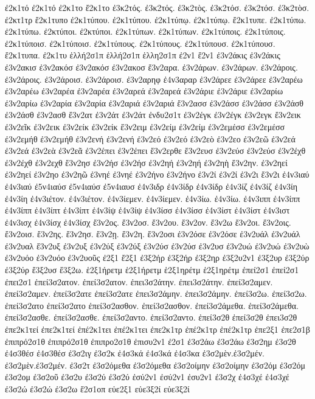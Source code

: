 {ἐ2κ1τό  ἐ2κ1τό
ἐ2κ1το
ἔ2κ1το
ἐ3κ2τός.  ἐ3κ2τός.
ἐ3κ2τὸς.
ἐ3κ2τόσ.  ἐ3κ2τόσ.
ἐ3κ2τὸσ.
ἐ2κτ1τρ
ἔ2κ1τυπο
ἐ2κ1τύπου.  ἐ2κ1τύπου.
ἐ2κ1τύπῳ.  ἐ2κ1τύπῳ.
ἔ2κ1τυπε.
ἐ2κ1τύπω.  ἐ2κ1τύπω.
ἐ2κτύποι.  ἐ2κτύποι.
ἐ2κ1τύπων.  ἐ2κ1τύπων.
ἐ2κ1τύποις.  ἐ2κ1τύποις.
ἐ2κ1τύποισ.  ἐ2κ1τύποισ.
ἐ2κ1τύπους.  ἐ2κ1τύπους.
ἐ2κ1τύπουσ.  ἐ2κ1τύπουσ.
ἔ2κ1τυπα.
ἐ2κ1τυ
ἑλλή2σ1π  ἑλλή2σ1π
ἑλλη2σ1π
ἐ2ν1
ἔ2ν1
ἐ3ν2άκις  ἐ3ν2άκις
ἐ3ν2ακισ
ἐ3ν2ακόσ  ἐ3ν2ακόσ
ἐ3ν2ακοσ
ἔ3ν2αρα.
ἐ3ν2άρων.  ἐ3ν2άρων.
ἐ3ν2άροις.  ἐ3ν2άροις.
ἐ3ν2άροισ.  ἐ3ν2άροισ.
ἐ3ν2αρηφ
ἐ4ν3αραρ
ἐ3ν2άρεε  ἐ3ν2άρεε
ἐ3ν2αρέω  ἐ3ν2αρέω
ἐ3ν2αρέα  ἐ3ν2αρέα
ἐ3ν2αρεά  ἐ3ν2αρεά
ἐ3ν2άριε  ἐ3ν2άριε
ἐ3ν2αρίω  ἐ3ν2αρίω
ἐ3ν2αρία  ἐ3ν2αρία
ἐ3ν2αριά  ἐ3ν2αριά
ἔ3ν2ασσ
ἐ3ν2άσσ  ἐ3ν2άσσ
ἐ3ν2άσθ  ἐ3ν2άσθ
ἐ3ν2ασθ
ἔ3ν2ατ
ἐ3ν2άτ  ἐ3ν2άτ
ἐνδυ2σ1τ
ἐ3ν2έγκ  ἐ3ν2έγκ
ἐ3ν2εγκ
ἔ3ν2εικ
ἐ3ν2εῖκ
ἐ3ν2εικ
ἐ3ν2είκ  ἐ3ν2είκ
ἔ3ν2ειμ
ἐ3ν2είμ  ἐ3ν2είμ
ἐ3ν2εμέσσ  ἐ3ν2εμέσσ
ἐ3ν2εμήθ  ἐ3ν2εμήθ
ἐ3ν2ενή  ἐ3ν2ενή
ἐ3ν2εό  ἐ3ν2εό
ἐ3ν2εὸ
ἐ3ν2εο
ἐ3ν2εῶ
ἐ3ν2εά  ἐ3ν2εά
ἐ3ν2εὰ
ἐ3ν2εᾶ
ἐ3ν2έπει  ἐ3ν2έπει
ἔ3ν2ερθε
ἔ3ν2ευσ
ἐ3ν2εύσ  ἐ3ν2εύσ
ἐ3ν2έχθ  ἐ3ν2έχθ
ἐ3ν2εχθ
ἔ3ν2ησ
ἐ3ν2ήσ  ἐ3ν2ήσ
ἐ3ν2ηή  ἐ3ν2ηή
ἐ3ν2ηὴ
ἔ3ν2ην.
ἐ3ν2ηεί  ἐ3ν2ηεί
ἐ3ν2ηο
ἐ3ν2ηῶ
ἐ3νηέ  ἐ3νηέ
ἐ3ν2ήνο  ἐ3ν2ήνο
ἐ3ν2ί  ἐ3ν2ί
ἐ3ν2ι
ἔ3ν2ι
ἐ4ν3ιαύ  ἐ4ν3ιαύ
ἐ5ν4ιαύσ  ἐ5ν4ιαύσ
ἐ5ν4ιαυσ
ἐ4ν3ιδρ
ἐ4ν3ίδρ  ἐ4ν3ίδρ
ἐ4ν3ίζ  ἐ4ν3ίζ
ἐ4ν3ίη  ἐ4ν3ίη
ἐ4ν3ιέτον.  ἐ4ν3ιέτον.
ἐ4ν3ίεμεν.  ἐ4ν3ίεμεν.
ἐ4ν3ίω.  ἐ4ν3ίω.
ἐ4ν3ιππ
ἐ4ν3ίππ  ἐ4ν3ίππ
ἐ4ν3ίπτ  ἐ4ν3ίπτ
ἐ4ν3ίψ  ἐ4ν3ίψ
ἐ4ν3ίσσ  ἐ4ν3ίσσ
ἐ4ν3ίστ  ἐ4ν3ίστ
ἐ4ν3ιστ
ἐ4ν3ισχ
ἐ4ν3ίσχ  ἐ4ν3ίσχ
ἔ3ν2ος.
ἔ3ν2οσ.
ἔ3ν2ου.
ἔ3ν2ον.
ἔ3ν2ω
ἔ3ν2οι.
ἔ3ν2οις.
ἔ3ν2οισ.
ἔ3ν2ης.
ἔ3ν2ησ.
ἔ3ν2ῃ.
ἔ3ν2η.
ἔ3ν2οσι
ἐ3ν2όσε  ἐ3ν2όσε
ἐ3ν2υάλ  ἐ3ν2υάλ
ἐ3ν2υαλ
ἔ3ν2υξ
ἐ3ν2υξ
ἐ3ν2ύξ  ἐ3ν2ύξ
ἐ3ν2ύσ  ἐ3ν2ύσ
ἐ3ν2υσ
ἐ3ν2υώ  ἐ3ν2υώ
ἐ3ν2υὼ
ἐ3ν2υόο  ἐ3ν2υόο
ἐ3ν2υοῦς
ἐ2ξ1
ἔ2ξ1
ἐ3ξ2ήρ  ἐ3ξ2ήρ
ἐ3ξ2ηρ
ἐ3ξ2υ2ν1
ἐ3ξ2υρ
ἐ3ξ2ύρ  ἐ3ξ2ύρ
ἔ3ξ2υσ
ἔ3ξ2ω.
ἑ2ξ1ήρετμ  ἑ2ξ1ήρετμ
ἑ2ξ1ηρέτμ  ἑ2ξ1ηρέτμ
ἐπεί2σ1  ἐπεί2σ1
ἐπει2σ1
ἐπεί3σ2ατον.  ἐπεί3σ2ατον.
ἐπει3σ2άτην.  ἐπει3σ2άτην.
ἐπεί3σ2αμεν.  ἐπεί3σ2αμεν.
ἐπεί3σ2ατε  ἐπεί3σ2ατε
ἐπει3σ2άμην.  ἐπει3σ2άμην.
ἐπεί3σ2ω.  ἐπεί3σ2ω.
ἐπεί3σ2ατο  ἐπεί3σ2ατο
ἐπεί3σ2ασθον.  ἐπεί3σ2ασθον.
ἐπεί3σ2άμεθα.  ἐπεί3σ2άμεθα.
ἐπεί3σ2ασθε.  ἐπεί3σ2ασθε.
ἐπεί3σ2αντο.  ἐπεί3σ2αντο.
ἐπεί3σ2θ  ἐπεί3σ2θ
ἐπει3σ2θ
ἐπε2κ1τεί  ἐπε2κ1τεί
ἐπέ2κ1τει  ἐπέ2κ1τει
ἐπε2κ1τρ
ἐπέ2κ1τρ  ἐπέ2κ1τρ
ἐπε2ξ1
ἐπε2σ1β
ἐπιπρό2σ1θ  ἐπιπρό2σ1θ
ἐπιπρο2σ1θ
ἐπισυ2ν1
ἐ2σ1
ἐ3σ2άω  ἐ3σ2άω
ἐ3σ2ημ
ἐ3σ2θ
ἐ4σ3θέσ  ἐ4σ3θέσ
ἐ3σ2ιγ
ἐ3σ2κ
ἐ4σ3κά  ἐ4σ3κά
ἐ4σ3κα
ἐ3σ2μὲν.ἐ3σ2μέν.  ἐ3σ2μὲν.ἐ3σ2μέν.
ἐ3σ2τ
ἐ3σ2όμεθα  ἐ3σ2όμεθα
ἐ3σ2οίμην  ἐ3σ2οίμην
ἐ3σ2όμ  ἐ3σ2όμ
ἐ3σ2ομ
ἐ3σ2οῦ
ἐ3σ2υ
ἐ3σ2ύ  ἐ3σ2ύ
ἐσύ2ν1  ἐσύ2ν1
ἐσυ2ν1
ἐ3σ2χ
ἐ4σ3χέ  ἐ4σ3χέ
ἐ3σ2ώ  ἐ3σ2ώ
ἐ3σ2ω
ἔ2σ1οπ
εὐε2ξ1
εὐε3ξ2ί  εὐε3ξ2ί
}
